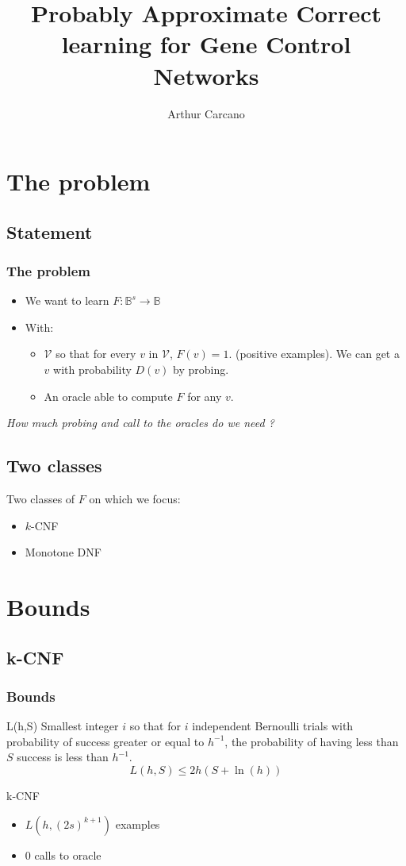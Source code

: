 \documentclass{beamer}
\title{Probably Approximate Correct learning for Gene Control Networks}
\author{Arthur Carcano}
\institute{ENS}
\newcommand{\transition}{\vspace{1em}\flushright \itshape}
\begin{document}
	
	\frame{
		\titlepage
	}
	
	\frame{
	\tableofcontents
}
	\section{The problem}
	\subsection{Statement}
	\begin{frame}
		\frametitle{The problem}
		\begin{itemize}
			\item We want to learn $F : \mathbb{B}^s \longrightarrow \mathbb{B}$
			\item With:
			\begin{itemize}
					\item $\mathcal{V}$ so that for every $v$ in  $\mathcal{V}$, $F(v) = 1$. (positive examples). We can get a $v$ with probability $D(v)$ by probing.
					\item An oracle able to compute $F$ for any $v$.
			\end{itemize}
		\end{itemize}
	\transition How much probing and call to the oracles do we need ?
	\end{frame}
\subsection{Two classes}
\begin{frame}
	Two classes of $F$ on which we focus:
	\begin{itemize}
		\item $k$-CNF
		\item Monotone DNF
	\end{itemize}
\end{frame}

\section{Bounds}
\subsection{k-CNF}
\begin{frame}
	\frametitle{Bounds}
	\begin{block}{L(h,S)}
			Smallest integer $i$ so that for $i$ independent Bernoulli trials with probability of success greater or equal to $h^{-1}$, the probability of having less than $S$ success is less than $h^{-1}$.
			$$L(h,S) \leq 2h\left(S+\ln(h)\right)$$
	\end{block}
	\begin{block}{k-CNF}
		\begin{itemize}
			\item $L(h,(2s)^{k+1})$ examples
			\item 0 calls to oracle
		\end{itemize}
	\end{block}
\end{frame}
\end{document}
